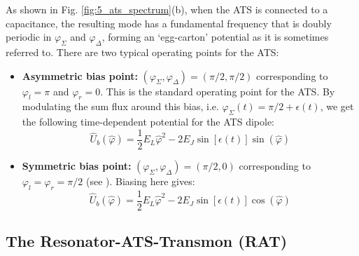 As shown in Fig. \ref{fig:5_ats_spectrum}(b), when the ATS is connected to a capacitance, the resulting mode has a fundamental frequency that is doubly periodic in $\varphi_\Sigma$ and $\varphi_\Delta$, forming an `egg-carton' potential as it is sometimes referred to. There are two typical operating points for the ATS:

\begin{itemize}
    \item \textbf{Asymmetric bias point:} $(\varphi_\Sigma, \varphi_\Delta) = (\pi/2, \pi/2)$ corresponding to $\varphi_l = \pi$ and $\varphi_r = 0$. This is the standard operating point for the ATS. By modulating the sum flux around this bias, i.e. $\varphi_\Sigma(t) = \pi/2 + \epsilon(t)$, we get the following time-dependent potential for the ATS dipole:
    \begin{equation}
        \hat{U}_b(\hat{\varphi}) = \frac{1}{2}E_L \hat{\varphi}^2 - 2E_J \sin[\epsilon(t)]\sin(\hat{\varphi})
    \end{equation}
\item \textbf{Symmetric bias point:} $(\varphi_\Sigma, \varphi_\Delta) = (\pi/2, 0)$ corresponding to $\varphi_l = \varphi_r = \pi/2$ (see \cite{maiti2024ancilla}). Biasing here gives:
\begin{equation}
        \hat{U}_b(\hat{\varphi}) = \frac{1}{2}E_L \hat{\varphi}^2 - 2E_J \sin[\epsilon(t)]\cos(\hat{\varphi})
    \end{equation}
\end{itemize}
\subsection{The Resonator-ATS-Transmon (RAT)}

